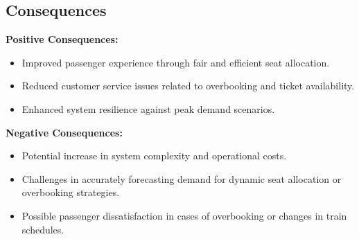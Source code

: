 \subsection*{Consequences}
\textbf{Positive Consequences:}
\begin{itemize}
    \item Improved passenger experience through fair and efficient seat allocation.
    \item Reduced customer service issues related to overbooking and ticket availability.
    \item Enhanced system resilience against peak demand scenarios.
\end{itemize}
\textbf{Negative Consequences:}
\begin{itemize}
    \item Potential increase in system complexity and operational costs.
    \item Challenges in accurately forecasting demand for dynamic seat allocation or overbooking strategies.
    \item Possible passenger dissatisfaction in cases of overbooking or changes in train schedules.
\end{itemize}
